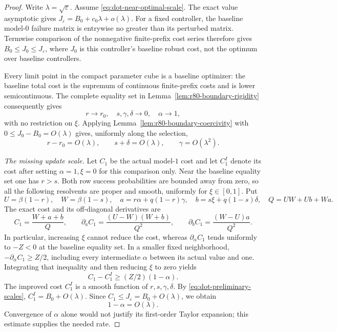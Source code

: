 \begin{proof}
Write $\lambda=\sqrt\varepsilon$.  Assume
\eqref{eq:dot-near-optimal-scale}.  The exact value asymptotic gives
$J_\varepsilon=B_0+c_0\lambda+o(\lambda)$.
For a fixed controller, the baseline model-$0$ failure matrix is
entrywise no greater than its perturbed matrix.  Termwise comparison
of the nonnegative finite-prefix cost series therefore gives
$B_0\le J_0\le J_\varepsilon$, where $J_0$ is this controller's
baseline robust cost, not the optimum over baseline controllers.

Every limit point in the compact parameter cube is a baseline
optimizer: the baseline total cost is the supremum of continuous
finite-prefix costs and is lower semicontinuous.  The complete equality
set in Lemma~\ref{lem:r80-boundary-rigidity} consequently gives
\[
 r\longrightarrow r_0,\quad s,\gamma,\delta\longrightarrow0,
 \quad\alpha\longrightarrow1,
\]
with no restriction on $\xi$.  Applying
Lemma~\ref{lem:r80-boundary-coercivity} with
$0\le J_0-B_0=O(\lambda)$ gives, uniformly along the selection,
\begin{equation}\label{eq:dot-preliminary-scales}
 r-r_0=O(\lambda),\qquad s+\delta=O(\lambda),\qquad
 \gamma=O(\lambda^2).
\end{equation}

\emph{The missing update scale.}
Let $C_1$ be the actual model-$1$ cost and let $C_1^I$ denote
its cost after setting $\alpha=1,\xi=0$ for this comparison only.
Near the baseline equality set one has $r>s$.  Both row success
probabilities are bounded away from zero, so all the following
resolvents are proper and smooth, uniformly for $\xi\in[0,1]$.
Put
\[
 U=\beta(1-r),\quad W=\beta(1-s),\quad
 a=r\alpha+q(1-r)\gamma,\quad
 b=s\xi+q(1-s)\delta,\quad
 Q=UW+Ub+Wa.
\]
The exact cost and its off-diagonal derivatives are
\begin{equation}\label{eq:dot-resolvent-derivatives}
 C_1=\frac{W+a+b}{Q},\qquad
 \partial_a C_1=\frac{(U-W)(W+b)}{Q^2},\qquad
 \partial_b C_1=\frac{(W-U)a}{Q^2}.
\end{equation}
In particular, increasing $\xi$ cannot reduce the cost, whereas
$\partial_\alpha C_1$ tends uniformly to $-Z<0$ at the
baseline equality set.  In a smaller fixed neighborhood,
$-\partial_\alpha C_1\ge Z/2$, including every intermediate
$\alpha$ between its actual value and one.  Integrating that
inequality and then reducing $\xi$ to zero yields
\[
 C_1-C_1^I\ge (Z/2)(1-\alpha).
\]
The improved cost $C_1^I$ is a smooth function of
$r,s,\gamma,\delta$.  By \eqref{eq:dot-preliminary-scales},
$C_1^I=B_0+O(\lambda)$.  Since $C_1\le J_\varepsilon=B_0+O(\lambda)$,
we obtain
\begin{equation}\label{eq:dot-alpha-scale}
 1-\alpha=O(\lambda).
\end{equation}
Convergence of $\alpha$ alone would not justify its first-order
Taylor expansion; this estimate supplies the needed rate.


\end{proof}
